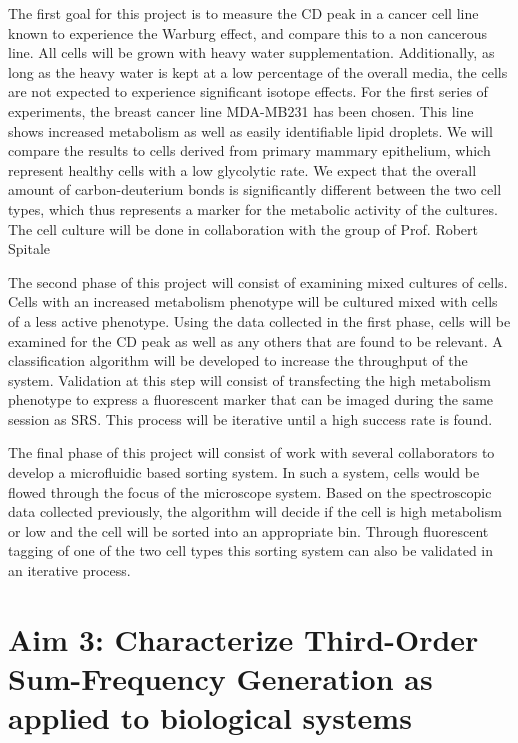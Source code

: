 The first goal for this project is to measure the CD peak in a cancer cell line known to experience the Warburg effect, and compare this to a non cancerous line.  All cells will be grown with heavy water supplementation. Additionally, as long as the heavy water is kept at a low percentage of the overall media, the cells are not expected to experience significant isotope effects.  For the first series of experiments, the breast cancer line MDA-MB231 has been chosen.  This line shows increased metabolism as well as easily identifiable lipid droplets.  We will compare the results to cells derived from primary mammary epithelium, which represent healthy cells with a low glycolytic rate.  We expect that the overall amount of carbon-deuterium bonds is significantly different between the two cell types, which thus represents a marker for the metabolic activity of the cultures. The cell culture will be done in collaboration with the group of Prof. Robert Spitale

The second phase of this project will consist of examining mixed cultures of cells.  Cells with an increased metabolism phenotype will be cultured mixed with cells of a less active phenotype.  Using the data collected in the first phase, cells will be examined for the CD peak as well as any others that are found to be relevant.  A classification algorithm will be developed to increase the throughput of the system.  Validation at this step will consist of transfecting the high metabolism phenotype to express a fluorescent marker that can be imaged during the same session as SRS.  This process will be iterative until a high success rate is found.

The final phase of this project will consist of work with several collaborators to develop a microfluidic based sorting system.  In such a system, cells would be flowed through the focus of the microscope system. Based on the spectroscopic data collected previously, the algorithm will decide if the cell is high metabolism or low and the cell will be sorted into an appropriate bin.  Through fluorescent tagging of one of the two cell types this sorting system can also be validated in an iterative process.  

\section{Aim 3: Characterize Third-Order Sum-Frequency Generation as applied to biological systems}

